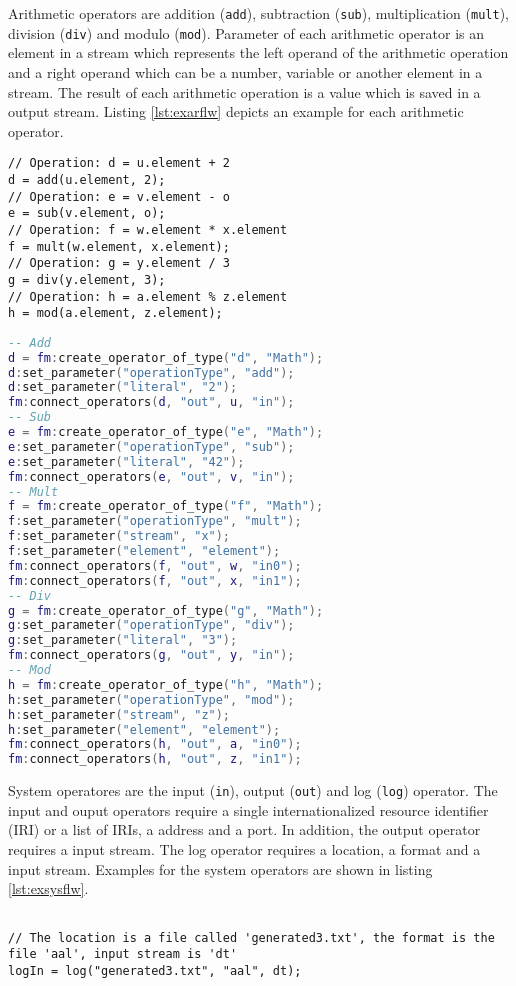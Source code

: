 Arithmetic operators are addition (\texttt{add}), subtraction 
(\texttt{sub}), multiplication (\texttt{mult}), division (\texttt{div}) and
modulo (\texttt{mod}). Parameter of each arithmetic operator is an element in
a stream which represents the left operand of the arithmetic operation and
a right operand which can be a number, variable or another element in a stream. 
The result of each arithmetic operation is a value which is saved in a output
stream. Listing \ref{lst:exarflw} depicts an example for each arithmetic 
operator.
\begin{lstlisting}[language=Flow, caption={\emph{Examples of Arithmetic Operators in Flow}},label={lst:exarflw}]
// Operation: d = u.element + 2
d = add(u.element, 2);
// Operation: e = v.element - o
e = sub(v.element, o);
// Operation: f = w.element * x.element
f = mult(w.element, x.element);
// Operation: g = y.element / 3
g = div(y.element, 3);
// Operation: h = a.element % z.element
h = mod(a.element, z.element); 
\end{lstlisting}

\begin{lstlisting}[language=LUA, caption={\emph{Examples of Arithmetic Operators in LUA}},label={lst:exanlua}]
-- Add
d = fm:create_operator_of_type("d", "Math");
d:set_parameter("operationType", "add");
d:set_parameter("literal", "2");
fm:connect_operators(d, "out", u, "in");
-- Sub
e = fm:create_operator_of_type("e", "Math");
e:set_parameter("operationType", "sub");
e:set_parameter("literal", "42");
fm:connect_operators(e, "out", v, "in");
-- Mult
f = fm:create_operator_of_type("f", "Math");
f:set_parameter("operationType", "mult");
f:set_parameter("stream", "x");
f:set_parameter("element", "element");
fm:connect_operators(f, "out", w, "in0");
fm:connect_operators(f, "out", x, "in1");
-- Div
g = fm:create_operator_of_type("g", "Math");
g:set_parameter("operationType", "div");
g:set_parameter("literal", "3");
fm:connect_operators(g, "out", y, "in");
-- Mod
h = fm:create_operator_of_type("h", "Math");
h:set_parameter("operationType", "mod");
h:set_parameter("stream", "z");
h:set_parameter("element", "element");
fm:connect_operators(h, "out", a, "in0");
fm:connect_operators(h, "out", z, "in1");
\end{lstlisting}
System operatores are the input (\texttt{in}), output (\texttt{out}) and log
(\texttt{log}) operator. The input and ouput operators require a single 
internationalized resource identifier (IRI) or a list of IRIs, a address and a 
port. In addition, the output operator requires a input stream. The log operator
requires a location, a format and a input stream. Examples for the system 
operators are shown in listing \ref{lst:exsysflw}.
\begin{lstlisting}[language=Flow, caption={\emph{Examples of system operators}},label={lst:exsysflw}]

// The location is a file called 'generated3.txt', the format is the file 'aal', input stream is 'dt'
logIn = log("generated3.txt", "aal", dt);
\end{lstlisting}

